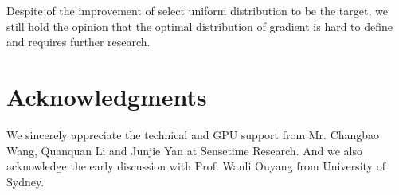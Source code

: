 \documentclass[letterpaper]{article} \usepackage{aaai19}  \usepackage{times}  \usepackage{helvet}  \usepackage{courier}  \usepackage{url}  \usepackage{graphicx}  \usepackage{amsmath,amssymb}
\begin{document}
Despite of the improvement of select uniform distribution to be the target, we still hold the opinion that the optimal distribution of gradient is hard to define and requires further research.


\section{Acknowledgments}
We sincerely appreciate the technical and GPU support from Mr. Changbao Wang, Quanquan Li and Junjie Yan at Sensetime Research. And we also acknowledge the early discussion with Prof. Wanli Ouyang from University of Sydney.




\end{document}
